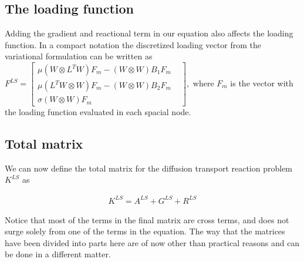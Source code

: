 \subsection{The loading function}
Adding the gradient and reactional term in our equation also affects the loading function. In a compact notation the discretized loading vector from the variational formulation can be written as
$
F^{LS}=
\begin{bmatrix}
	\mu(W \otimes L^T W)F_m - (W \otimes W)B_1F_m \\
	\mu(L^TW \otimes W)F_m - (W \otimes W)B_2F_m \\
	\sigma(W\otimes W)F_m & 
	\label{mat:FLS}
\end{bmatrix},
$
where $F_m$ is the vector with the loading function evaluated in each spacial node.
%

\subsection{Total matrix}
We can now define the total matrix for the diffusion transport reaction problem $K^{LS}$ as

\begin{align}
	K^{LS} = A^{LS} + G^{LS} + R^{LS}
	\label{eq:difftransMatrixSum}
\end{align}
%

Notice that most of the terms in the final matrix are cross terms, and does not surge solely from one of the terms in the equation. The way that the matrices have been divided into parts here are of now other than practical reasons and can be done in a different matter.  

